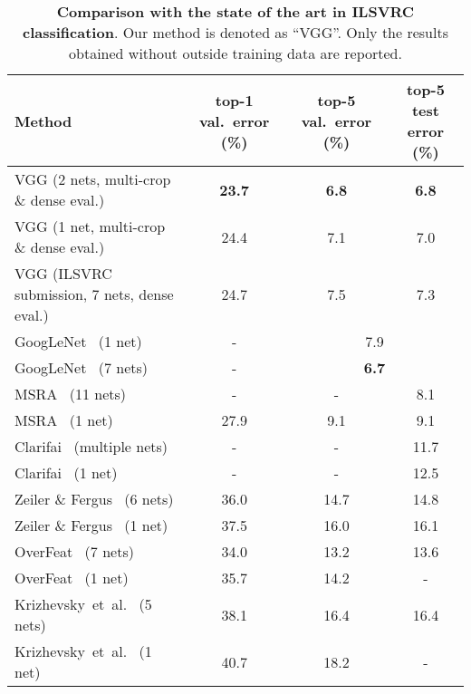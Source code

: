 \documentclass{article} \usepackage{iclr2015,times}
\makeatletter
\newcommand*{\etal}{et~al.\@\xspace}
\makeatother
\begin{document}
\vspace{-1em}

\begin{table}[htb]
\setlength{\tabcolsep}{2pt}
\small
\centering
\caption{\textbf{Comparison with the state of the art in ILSVRC classification}. Our method is denoted as ``VGG''.
Only the results obtained without outside training data are reported.
}
\begin{tabular}{|l|c|c|c|} \hline
Method & top-1 val.\ error (\%) & top-5 val.\ error (\%) & top-5 test error (\%) \\ \hline
VGG (2 nets, multi-crop \& dense eval.) & \textbf{23.7} & \textbf{6.8} & \textbf{6.8} \\ \hline
VGG (1 net, multi-crop \& dense eval.) & 24.4 & 7.1 & 7.0 \\ \hline\hline
VGG (ILSVRC submission, 7 nets, dense eval.) & 24.7 & 7.5 & 7.3 \\ \hline\hline
GoogLeNet~\citep{Szegedy14} (1 net) & - & \multicolumn{2}{c|}{7.9} \\ \hline
GoogLeNet~\citep{Szegedy14} (7 nets) & - & \multicolumn{2}{c|}{\textbf{6.7}} \\ \hline
MSRA~\citep{He14} (11 nets) & - & - & 8.1 \\ \hline
MSRA~\citep{He14} (1 net) & 27.9 & 9.1 & 9.1 \\ \hline
Clarifai~\citep{Russakovsky14} (multiple nets) & -  & - & 11.7 \\ \hline
Clarifai~\citep{Russakovsky14} (1 net) & - & - & 12.5 \\ \hline
Zeiler \& Fergus~\citep{Zeiler13} (6 nets) & 36.0 & 14.7 & 14.8 \\ \hline
Zeiler \& Fergus~\citep{Zeiler13} (1 net) & 37.5 & 16.0 & 16.1 \\ \hline
OverFeat~\citep{Sermanet14} (7 nets) & 34.0 & 13.2 & 13.6 \\ \hline
OverFeat~\citep{Sermanet14} (1 net) & 35.7 & 14.2 & - \\ \hline
Krizhevsky~\etal~\citep{Krizhevsky12} (5 nets) & 38.1 & 16.4 & 16.4 \\ \hline
Krizhevsky~\etal~\citep{Krizhevsky12} (1 net) & 40.7 & 18.2 & - \\ \hline
\end{tabular}
\label{tab:SOA}
\end{table}


\vspace{-1em}
\end{document}
